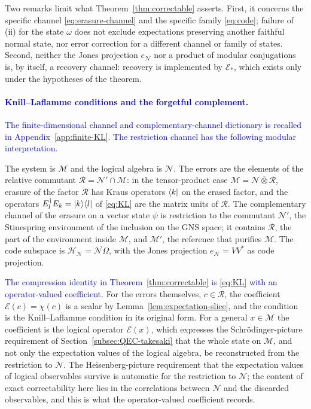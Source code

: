 \documentclass[a4paper,11pt]{article}
\theoremstyle{definition}
\newcommand{\mR}{\mathcal{R}}
\newcommand{\mN}{\mathcal{N}}
\newcommand{\mH}{\mathcal{H}}
\newcommand{\mM}{\mathcal{M}}
\newcommand{\NL}[1]{\textcolor{blue}{#1}}
\newcommand{\mE}{\mathcal{E}}
\begin{document}
Two remarks limit what Theorem~\ref{thm:correctable} asserts. First, it concerns the specific channel \eqref{eq:erasure-channel} and the specific family \eqref{eq:code}; failure of (ii) for the state $\omega$ does not exclude expectations preserving another faithful normal state, nor error correction for a different channel or family of states. Second, neither the Jones projection $e_{\mN}$ nor a product of modular conjugations is, by itself, a recovery channel: recovery is implemented by $\mE_*$, which exists only under the hypotheses of the theorem.

\paragraph{\NL{Knill--Laflamme conditions and the forgetful complement.}}
\label{subsec:QEC-KL}
\NL{The finite-dimensional channel and complementary-channel dictionary is recalled in Appendix~\ref{app:finite-KL}. The restriction channel has the following modular interpretation.}

The system is $\mM$ and the logical algebra is $\mN$. The errors are the elements of the relative commutant $\mR=\mN'\cap\mM$: in the tensor-product case $\mM=\mN\overline\otimes\mR$, erasure of the factor $\mR$ has Kraus operators $\bra{k}$ on the erased factor, and the operators $E_l^\dagger E_k=\ket{k}\!\bra{l}$ of \eqref{eq:KL} are the matrix units of $\mR$. The complementary channel of the erasure on a vector state $\psi$ is restriction to the commutant $\mN'$, the Stinespring environment of the inclusion on the GNS space; it contains $\mR$, the part of the environment inside $\mM$, and $\mM'$, the reference that purifies $\mM$. The code subspace is $\mH_{\mN}=\overline{\mN\Omega}$, with the Jones projection $e_{\mN}=VV^*$ as code projection. 

\NL{The compression identity in Theorem~\ref{thm:correctable} is \eqref{eq:KL} with an operator-valued coefficient.} For the errors themselves, $c\in\mR$, the coefficient $\mE(c)=\chi(c)$ is a scalar by Lemma~\ref{lem:expectation-slice}, and the condition is the Knill--Laflamme condition in its original form. For a general $x\in\mM$ the coefficient is the logical operator $\mE(x)$, which expresses the Schr\"odinger-picture requirement of Section~\ref{subsec:QEC-takesaki} that the whole state on $\mM$, and not only the expectation values of the logical algebra, be reconstructed from the restriction to $\mN$. The Heisenberg-picture requirement that the expectation values of logical observables survive is automatic for the restriction to $\mN$; the content of exact correctability here lies in the correlations between $\mN$ and the discarded observables, and this is what the operator-valued coefficient records.
\end{document}
